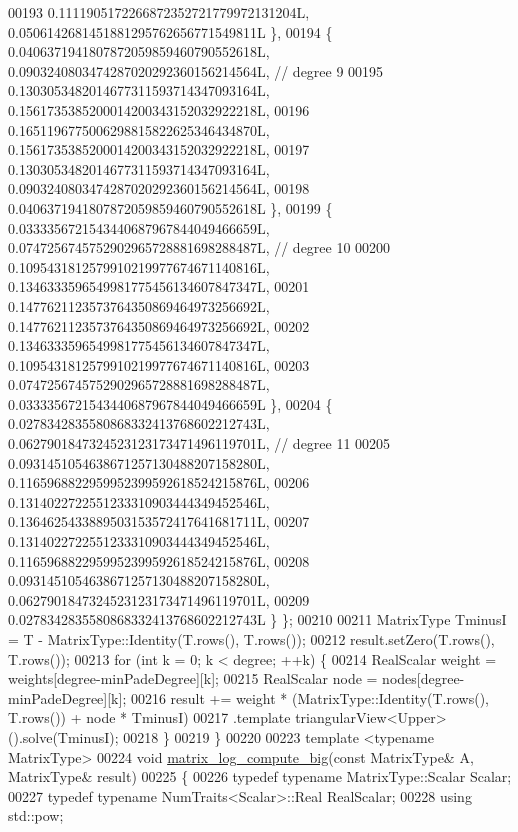 \begin{DoxyCode}
00193       0.1111905172266872352721779972131204L, 0.0506142681451881295762656771549811L \},
00194     \{ 0.0406371941807872059859460790552618L, 0.0903240803474287020292360156214564L,  \textcolor{comment}{// degree 9}
00195       0.1303053482014677311593714347093164L, 0.1561735385200014200343152032922218L,
00196       0.1651196775006298815822625346434870L, 0.1561735385200014200343152032922218L,
00197       0.1303053482014677311593714347093164L, 0.0903240803474287020292360156214564L,
00198       0.0406371941807872059859460790552618L \},
00199     \{ 0.0333356721543440687967844049466659L, 0.0747256745752902965728881698288487L,  \textcolor{comment}{// degree 10}
00200       0.1095431812579910219977674671140816L, 0.1346333596549981775456134607847347L,
00201       0.1477621123573764350869464973256692L, 0.1477621123573764350869464973256692L,
00202       0.1346333596549981775456134607847347L, 0.1095431812579910219977674671140816L,
00203       0.0747256745752902965728881698288487L, 0.0333356721543440687967844049466659L \},
00204     \{ 0.0278342835580868332413768602212743L, 0.0627901847324523123173471496119701L,  \textcolor{comment}{// degree 11}
00205       0.0931451054638671257130488207158280L, 0.1165968822959952399592618524215876L,
00206       0.1314022722551233310903444349452546L, 0.1364625433889503153572417641681711L,
00207       0.1314022722551233310903444349452546L, 0.1165968822959952399592618524215876L,
00208       0.0931451054638671257130488207158280L, 0.0627901847324523123173471496119701L,
00209       0.0278342835580868332413768602212743L \} \};
00210 
00211   MatrixType TminusI = T - MatrixType::Identity(T.rows(), T.rows());
00212   result.setZero(T.rows(), T.rows());
00213   \textcolor{keywordflow}{for} (\textcolor{keywordtype}{int} k = 0; k < degree; ++k) \{
00214     RealScalar weight = weights[degree-minPadeDegree][k];
00215     RealScalar node = nodes[degree-minPadeDegree][k];
00216     result += weight * (MatrixType::Identity(T.rows(), T.rows()) + node * TminusI)
00217                        .template triangularView<Upper>().solve(TminusI);
00218   \}
00219 \} 
00220 
00223 \textcolor{keyword}{template} <\textcolor{keyword}{typename} MatrixType>
00224 \textcolor{keywordtype}{void} \hyperlink{namespace_eigen_1_1internal_ac2de7acbbff34ec236ee5e9fdb2eee38}{matrix\_log\_compute\_big}(\textcolor{keyword}{const} MatrixType& A, MatrixType& result)
00225 \{
00226   \textcolor{keyword}{typedef} \textcolor{keyword}{typename} MatrixType::Scalar Scalar;
00227   \textcolor{keyword}{typedef} \textcolor{keyword}{typename} NumTraits<Scalar>::Real RealScalar;
00228   \textcolor{keyword}{using} std::pow;

\end{DoxyCode}
